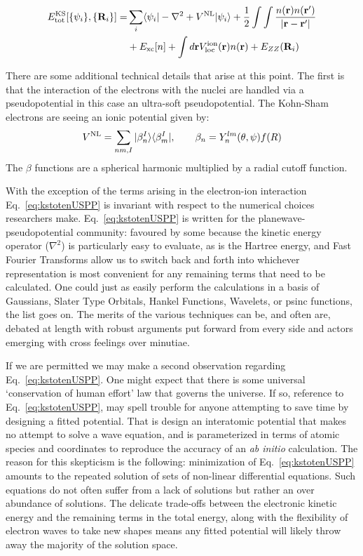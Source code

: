 \begin{align}
\label{eq:kstotenUSPP}
	E^{\rm KS}_{\rm tot}[\{\psi_i\},\{{\bf R}_{i}\}] =  & \sum_{i}\langle \psi_{i} |-\nabla^{2} + V^{\rm NL} | \psi_{i}\rangle
                                               + \frac{1}{2}\int\int \frac{n({\bf r})n({\bf r}')}{|{\bf r}-{\bf r}'|} \nonumber \\
					       &+ E_{\rm xc}[n] + \int d{\bf r} V^{\rm ion}_{\rm loc}({\bf r})n({\bf r}) + E_{ZZ}({{\bf R}_{i}}) 
\end{align}

There are some additional technical details that arise at this point.
The first is that the interaction of the electrons with the nuclei are handled via a pseudopotential
in this case an ultra-soft pseudopotential\cite{vanderbilt90}. The Kohn-Sham electrons are 
seeing an ionic potential given by:
%
\begin{equation}
V^{\rm NL} =  \sum_{nm,I} |\beta_{n}^{I} \rangle \langle \beta_{m}^{I}|, \qquad \beta_{n} = Y^{lm}_{n}(\theta,\psi)f(R)
\end{equation}
%
The $\beta$ functions are a spherical harmonic multiplied by a radial cutoff function.

With the exception of the terms arising in the electron-ion interaction
Eq.~\ref{eq:kstotenUSPP} is invariant with respect to the numerical choices researchers make. 
Eq.~\ref{eq:kstotenUSPP} is written for the planewave-pseudopotential community:
favoured by some because the kinetic energy operator ($\nabla^{2}$) is particularly easy to evaluate, 
as is the Hartree energy, and Fast Fourier Transforms allow us to switch back and forth into whichever
representation is most convenient for any remaining terms that need to be calculated. 
One could just as easily perform the calculations
in a basis of Gaussians, Slater Type Orbitals, Hankel Functions, Wavelets, or psinc functions, the list goes on.
The merits of the various techniques can be, and often are, debated at length with
robust arguments put forward from every side and actors emerging with
cross feelings over minutiae. 

If we are permitted we may make a second observation regarding Eq.~\ref{eq:kstotenUSPP}. 
One might expect that there is some universal `conservation of human effort' 
law that governs the universe. If so, reference to Eq.~\ref{eq:kstotenUSPP},
may spell trouble for anyone attempting to save time by designing a
fitted potential. That is design an interatomic potential that makes
no attempt to solve a wave equation, and is parameterized in terms 
of atomic species and coordinates
to reproduce the accuracy of an \textit{ab initio} calculation. 
The reason for this skepticism is the following: minimization of Eq.~\ref{eq:kstotenUSPP} 
amounts to the repeated solution of sets of non-linear differential equations.
Such equations do not often suffer from a lack of solutions but rather an
over abundance of solutions\cite{haydock97}. The delicate trade-offs between 
the electronic kinetic energy and the remaining terms in the total energy, along with
the flexibility of electron waves to take new shapes means
any fitted potential will likely throw away the majority 
of the solution space.

